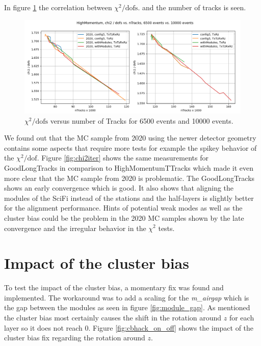 In figure \ref{fig:chi2tracksdec} the correlation between $\chi^2 / \text{dofs}$. and the number of tracks is seen.


\begin{figure}
  \centering
  \includegraphics[width=\textwidth]{plots/LHCB_week_dec/chi2_vs_tracks_normal.png}
  \caption{$\chi^2 / \text{dofs}$ versus number of Tracks for 6500 events and 10000 events.}
  \label{fig:chi2tracksdec}
\end{figure}

We found out that the MC sample from 2020 using the newer detector geometry contains some aspects that require more tests for example the spikey behavior of the $\chi^2 / \text{dof}$. Figure \ref{fig:chi2iter} shows the same measurements for GoodLongTracks in comparison to HighMomentumTTracks which made it even more clear that the MC sample from 2020 is problematic. The GoodLongTracks shows an early convergence which is good. It also shows that aligning the modules of the SciFi instead of the stations and the half-layers is slightly better for the alignment performance. Hints of potential weak modes as well as the cluster bias could be the problem in the 2020 MC samples shown by the late convergence and the irregular behavior in the $\chi^2$ tests.

\section{Impact of the cluster bias}
\label{sec:clusterbias}

To test the impact of the cluster bias, a momentary fix was found and implemented. The workaround was to add a scaling for the \textit{m\_airgap}\cite{gap} which is the gap between the modules as seen in figure \ref{fig:module_gap}.
As mentioned the cluster bias most certainly causes the shift in the rotation around $z$ for each layer so it does not reach 0.
Figure \ref{fig:cbhack_on_off} shows the impact of the cluster bias fix regarding the rotation around $z$.

